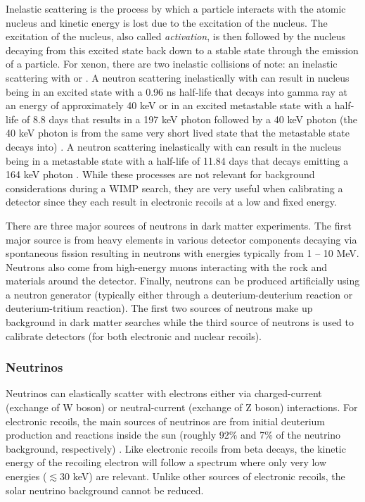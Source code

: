 Inelastic scattering is the process by which a particle interacts with the atomic nucleus and kinetic energy is lost due to the excitation of the nucleus.  The excitation of the nucleus, also called \textit{activation}, is then followed by the nucleus decaying from this excited state back down to a stable state through the emission of a particle.  For xenon, there are two inelastic collisions of note:  an inelastic scattering with  or .  A neutron scattering inelastically with  can result in nucleus being in an excited state with a 0.96 ns half-life that decays into gamma ray at an energy of approximately 40 keV or in an excited metastable state with a half-life of 8.8 days that results in a 197 keV photon followed by a 40 keV photon (the 40 keV photon is from the same very short lived state that the metastable state decays into) \cite{timar2014nuclear}.  A neutron scattering inelastically with  can result in the nucleus being in a metastable state with a half-life of 11.84 days that decays emitting a 164 keV photon \cite{khazov2006nuclear}.   While these processes are not relevant for background considerations during a WIMP search, they are very useful when calibrating a detector since they each result in electronic recoils at a low and fixed energy.

There are three major sources of neutrons in dark matter experiments.  The first major source is from heavy elements in various detector components decaying via spontaneous fission resulting in neutrons with energies typically from 1 -- 10 MeV.  Neutrons also come from high-energy muons interacting with the rock and materials around the detector.  Finally, neutrons can be produced artificially using a neutron generator (typically either through a deuterium-deuterium reaction or deuterium-tritium reaction).  The first two sources of neutrons make up background in dark matter searches while the third source of neutrons is used to calibrate detectors (for both electronic and nuclear recoils).


\subsubsection{Neutrinos}


Neutrinos can elastically scatter with electrons either via charged-current (exchange of W boson) or neutral-current (exchange of Z boson) interactions.  For electronic recoils, the main sources of neutrinos are from initial deuterium production and  reactions inside the sun (roughly 92\% and 7\% of the neutrino background, respectively) \cite{aprile2016physics}.  Like electronic recoils from beta decays, the kinetic energy of the recoiling electron will follow a spectrum where only very low energies ($\lesssim 30$ keV) are relevant.  Unlike other sources of electronic recoils, the solar neutrino background cannot be reduced.

